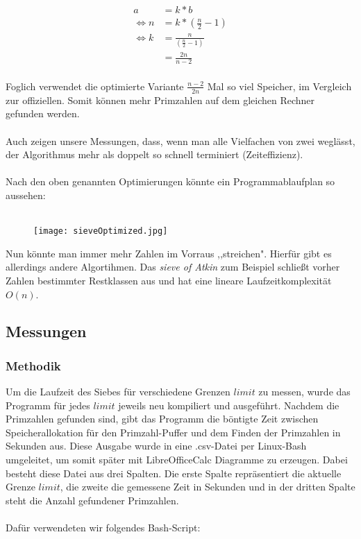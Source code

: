 \documentclass[a4paper,12pt]{article}
\begin{document}
\begin{align}
a &= k * b\\
\Leftrightarrow n &= k * ( \frac{n}{2} - 1 )\\
\Leftrightarrow k &= \frac{n}{( \frac{n}{2} - 1 )}\\
&= \frac{2n}{n-2}
\end{align}
\\
Foglich verwendet die optimierte Variante $\frac{n-2}{2n}$ Mal so viel Speicher, im Vergleich zur offiziellen. Somit können mehr Primzahlen auf dem gleichen Rechner gefunden werden.\\
\\
Auch zeigen unsere Messungen, dass, wenn man alle Vielfachen von zwei weglässt, der Algorithmus mehr als doppelt so schnell terminiert (Zeiteffizienz).\\
\\
Nach den oben genannten Optimierungen könnte ein Programmablaufplan so aussehen:\\\\
\begin{figure}[H]
\texttt{[image: sieveOptimized.jpg]}
\end{figure}

\noindent Nun könnte man immer mehr Zahlen im Vorraus ,,streichen". Hierfür gibt es allerdings andere Algortihmen. Das \emph{sieve of Atkin} zum Beispiel schließt vorher Zahlen bestimmter Restklassen aus und hat eine lineare Laufzeitkomplexität $O(n)$.

\subsection{Messungen}
\subsubsection{Methodik}
Um die Laufzeit des Siebes für verschiedene Grenzen $limit$ zu messen, wurde das Programm für jedes $limit$ jeweils neu kompiliert und ausgeführt. Nachdem die Primzahlen gefunden sind, gibt das Programm die böntigte Zeit zwischen Speicherallokation für den Primzahl-Puffer und dem Finden der Primzahlen in Sekunden aus. Diese Ausgabe wurde in eine .csv-Datei per Linux-Bash umgeleitet, um somit später mit LibreOfficeCalc Diagramme zu erzeugen. Dabei besteht diese Datei aus drei Spalten. Die erste Spalte repräsentiert die aktuelle Grenze $limit$, die zweite die gemessene Zeit in Sekunden und in der dritten Spalte steht die Anzahl gefundener Primzahlen.
\\\\
\noindent Dafür verwendeten wir folgendes Bash-Script:
\end{document}
